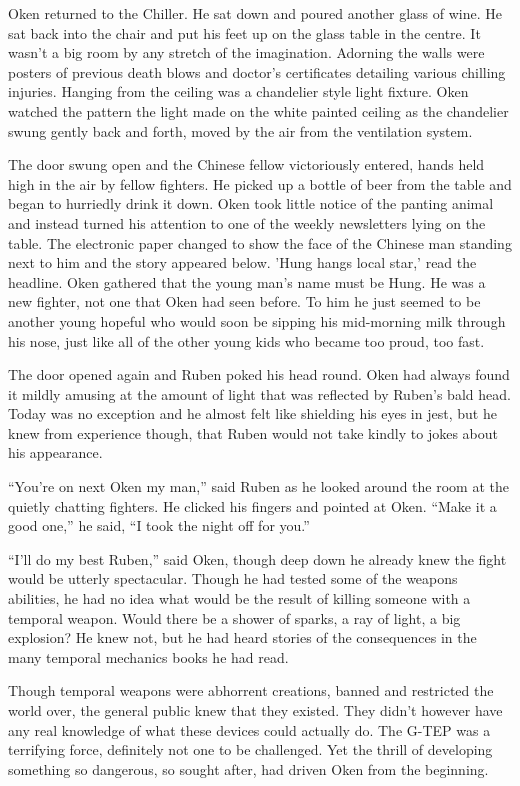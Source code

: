 Oken returned to the Chiller. He sat down and poured another glass of wine. He sat back into the chair and put his feet up on the glass table in the centre. It wasn't a big room by any stretch of the imagination. Adorning the walls were posters of previous death blows and doctor's certificates detailing various chilling injuries. Hanging from the ceiling was a chandelier style light fixture. Oken watched the pattern the light made on the white painted ceiling as the chandelier swung gently back and forth, moved by the air from the ventilation system.

The door swung open and the Chinese fellow victoriously entered, hands held high in the air by fellow fighters. He picked up a bottle of beer from the table and began to hurriedly drink it down. Oken took little notice of the panting animal and instead turned his attention to one of the weekly newsletters lying on the table. The electronic paper changed to show the face of the Chinese man standing next to him and the story appeared below. 'Hung hangs local star,' read the headline. Oken gathered that the young man's name must be Hung. He was a new fighter, not one that Oken had seen before. To him he just seemed to be another young hopeful who would soon be sipping his mid-morning milk through his nose, just like all of the other young kids who became too proud, too fast.

The door opened again and Ruben poked his head round. Oken had always found it mildly amusing at the amount of light that was reflected by Ruben's bald head. Today was no exception and he almost felt like shielding his eyes in jest, but he knew from experience though, that Ruben would not take kindly to jokes about his appearance.

``You're on next Oken my man,'' said Ruben as he looked around the room at the quietly chatting fighters. He clicked his fingers and pointed at Oken. ``Make it a good one,'' he said, ``I took the night off for you.''

``I'll do my best Ruben,'' said Oken, though deep down he already knew the fight would be utterly spectacular. Though he had tested some of the weapons abilities, he had no idea what would be the result of killing someone with a temporal weapon. Would there be a shower of sparks, a ray of light, a big explosion? He knew not, but he had heard stories of the consequences in the many temporal mechanics books he had read.

Though temporal weapons were abhorrent creations, banned and restricted the world over, the general public knew that they existed. They didn't however have any real knowledge of what these devices could actually do. The G-TEP was a terrifying force, definitely not one to be challenged. Yet the thrill of developing something so dangerous, so sought after, had driven Oken from the beginning.

